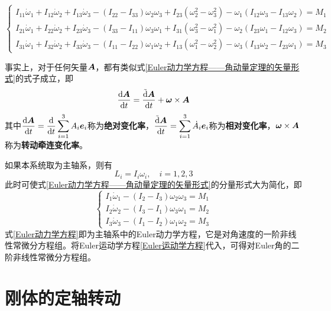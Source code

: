\begin{equation}
\begin{cases}
	I_{11}\dot{\omega}_1+I_{12}\dot{\omega}_2+I_{13}\dot{\omega}_3-(I_{22}-I_{33})\omega_2\omega_3+I_{23}(\omega_2^2-\omega_3^2)-\omega_1(I_{12}\omega_3-I_{13}\omega_2)=M_1 \\
	I_{21}\dot{\omega}_1+I_{22}\dot{\omega}_2+I_{23}\dot{\omega}_3-(I_{33}-I_{11})\omega_3\omega_1+I_{31}(\omega_3^2-\omega_1^2)-\omega_2(I_{23}\omega_1-I_{12}\omega_3)=M_2 \\
	I_{31}\dot{\omega}_1+I_{32}\dot{\omega}_2+I_{33}\dot{\omega}_3-(I_{11}-I_{22})\omega_1\omega_2+I_{13}(\omega_1^2-\omega_2^2)-\omega_3(I_{13}\omega_2-I_{23}\omega_1)=M_3
\end{cases}
\label{Euler动力学方程——角动量定理的分量形式}
\end{equation}

事实上，对于任何矢量$\boldsymbol{A}$，都有类似式\eqref{Euler动力学方程——角动量定理的矢量形式}的式子成立，即
\begin{equation}
	\frac{\mathrm{d} \boldsymbol{A}}{\mathrm{d} t} = \frac{\tilde{\mathrm{d}} \boldsymbol{A}}{\mathrm{d} t} + \boldsymbol{\omega} \times \boldsymbol{A}
	\label{chapter6:相对变化率和绝对变化率之间的关系}
\end{equation}
其中$\displaystyle \dfrac{\mathrm{d} \boldsymbol{A}}{\mathrm{d} t} = \dfrac{\mathrm{d}}{\mathrm{d} t}\sum_{i=1}^3A_i\boldsymbol{e}_i$称为{\bf 绝对变化率}，$\displaystyle \frac{\tilde{\mathrm{d}} \boldsymbol{A}}{\mathrm{d} t} = \sum_{i=1}^3 \dot{A}_i \boldsymbol{e}_i$称为{\bf 相对变化率}，$\boldsymbol{\omega} \times \boldsymbol{A}$称为{\bf 转动牵连变化率}。

如果本系统取为主轴系，则有
\begin{equation*}
	L_i = I_i \omega_i,\quad i = 1,2,3
\end{equation*}
此时可使式\eqref{Euler动力学方程——角动量定理的矢量形式}的分量形式大为简化，即
\begin{equation}
\begin{cases}
	I_1 \dot{\omega}_1 - (I_2-I_3)\omega_2 \omega_3 = M_1\\
	I_2 \dot{\omega}_2 - (I_3-I_1)\omega_3 \omega_1 = M_2\\
	I_3 \dot{\omega}_3 - (I_1-I_2)\omega_1 \omega_2 = M_3
\end{cases}
\label{Euler动力学方程}
\end{equation}
式\eqref{Euler动力学方程}即为主轴系中的{\heiti Euler动力学方程}，它是对角速度的一阶非线性常微分方程组。将Euler运动学方程\eqref{Euler运动学方程}代入，可得对Euler角的二阶非线性常微分方程组。

\section{刚体的定轴转动}

